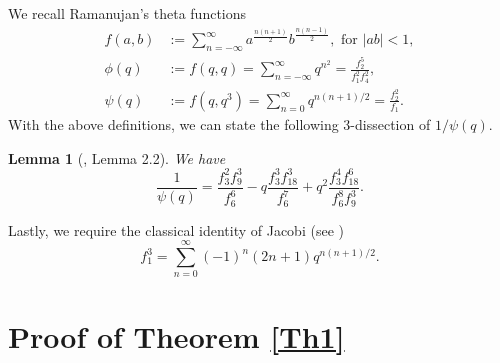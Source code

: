 \documentclass{amsart}
\newtheorem{lemma}[theorem]{Lemma}
\begin{document}
We recall Ramanujan's theta functions
\begin{align*}
	f(a,b) & :=\sum_{n=-\infty}^\infty a^\frac{n(n+1)}{2}b^\frac{n(n-1)}{2}, \mbox{ for } |ab|<1, \nonumber \\
	\phi(q) & := f(q,q) = \sum_{n=-\infty}^{\infty} q^{n^2} = \frac{f_2^5}{f_1^2f_4^2}, \\
	\psi(q) & := f(q,q^3) = \sum_{n=0}^{\infty} q^{n(n+1)/2} = \frac{f_2^2}{f_1}. 
\end{align*}
With the above definitions, we can state the following 3-dissection of $1/\psi(q)$.


\begin{lemma}[\cite{Shane}, Lemma 2.2] We have
	\begin{equation}
	\frac{1}{\psi(q)} = \frac{f_3^2f_9^3}{f_6^6} - q\frac{f_3^3f_{18}^3}{f_6^7} + q^2\frac{f_3^4f_{18}^6}{f_6^8f_9^3}.
	\label{3diss1/psi}
	\end{equation}
\end{lemma}

Lastly, we require the classical identity of Jacobi (see \cite[Theorem 1.3.9]{B1})
\begin{equation}
	f_1^3 = \sum_{n=0}^{\infty} (-1)^n (2n+1) q^{n(n+1)/2}.
\label{Jacobi}
\end{equation}


\section{Proof of Theorem \ref{Th1}}
\end{document}
